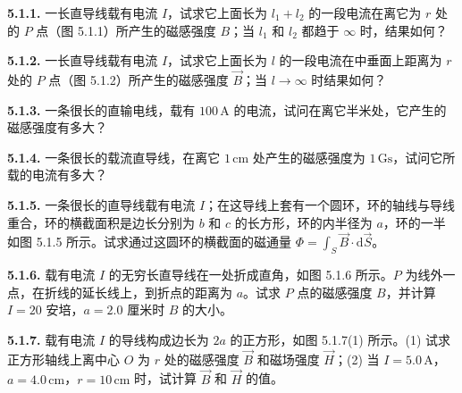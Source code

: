 \textbf{5.1.1.} 一长直导线载有电流 $I$，试求它上面长为 $l_{1} + l_{2}$ 的一段电流在离它为 $r$ 处的 $P$ 点（图 5.1.1）所产生的磁感强度 $B$；当 $l_{1}$ 和 $l_{2}$ 都趋于 $\infty$ 时，结果如何？

\begin{center}
\end{center}

\vfill
\newpage

\textbf{5.1.2.} 一长直导线载有电流 $I$，试求它上面长为 $l$ 的一段电流在中垂面上距离为 $r$ 处的 $P$ 点（图 5.1.2）所产生的磁感强度 $\vec{B}$；当 $l \to \infty$ 时结果如何？

\begin{center}
\end{center}

\vfill
\newpage

\textbf{5.1.3.} 一条很长的直输电线，载有 $100\,\mathrm{A}$ 的电流，试问在离它半米处，它产生的磁感强度有多大？

\vfill
\newpage

\textbf{5.1.4.} 一条很长的载流直导线，在离它 $1\,\mathrm{cm}$ 处产生的磁感强度为 $1\,\mathrm{Gs}$，试问它所载的电流有多大？

\vfill
\newpage

\textbf{5.1.5.} 一条很长的直导线载有电流 $I$；在这导线上套有一个圆环，环的轴线与导线重合，环的横截面积是边长分别为 $b$ 和 $c$ 的长方形，环的内半径为 $a$，环的一半如图 5.1.5 所示。试求通过这圆环的横截面的磁通量 $\displaystyle \Phi = \int_{S} \vec{B} \cdot \mathrm{d}\vec{S}$。

\begin{center}
\end{center}

\vfill
\newpage

\textbf{5.1.6.} 载有电流 $I$ 的无穷长直导线在一处折成直角，如图 5.1.6 所示。$P$ 为线外一点，在折线的延长线上，到折点的距离为 $a$。试求 $P$ 点的磁感强度 $B$，并计算 $I = 20$ 安培，$a = 2.0$ 厘米时 $B$ 的大小。

\begin{center}
\end{center}

\vfill
\newpage

\textbf{5.1.7.} 载有电流 $I$ 的导线构成边长为 $2a$ 的正方形，如图 5.1.7(1) 所示。(1) 试求正方形轴线上离中心 $O$ 为 $r$ 处的磁感强度 $\vec{B}$ 和磁场强度 $\vec{H}$；(2) 当 $I = 5.0\,\mathrm{A}$，$a = 4.0\,\mathrm{cm}$，$r = 10\,\mathrm{cm}$ 时，试计算 $\vec{B}$ 和 $\vec{H}$ 的值。

